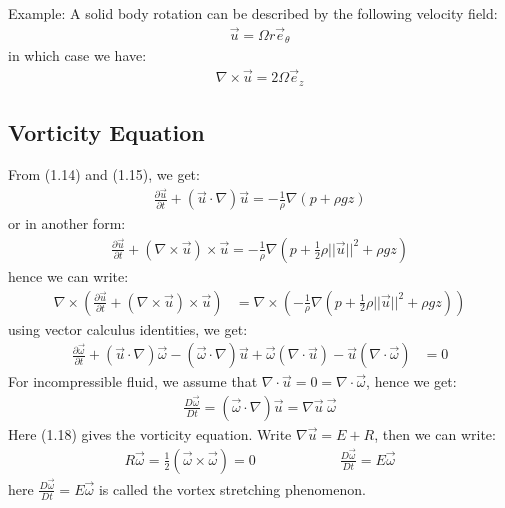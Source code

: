 \documentclass[11pt]{book}
\theoremstyle{break}
\theoremstyle{break}
\newcommand{\example}{\color{green}Example: \color{black}}
\begin{document}
\example 
A solid body rotation can be described by the following velocity field:
\begin{align*}
\vec{u} = \Omega r \vec{e}_{\theta}
\end{align*}
in which case we have:
\begin{align*}
\nabla \times \vec{u} = 2\Omega \vec{e}_{z}
\end{align*}

\hfill\break
\newpage
\subsection*{Vorticity Equation}
From (1.14) and (1.15), we get:
\begin{align*}
\frac{\partial \vec{u}}{\partial t} + (\vec{u}\cdot \nabla) \vec{u}= -\frac{1}{\rho} \nabla(p + \rho g z)
\end{align*}
or in another form:
\begin{align*}
\frac{\partial \vec{u}}{\partial t} + (\nabla \times \vec{u})\times \vec{u} = -\frac{1}{\rho} \nabla \left(p+ \frac{1}{2}\rho ||\vec{u}||^2 + \rho g z\right)
\end{align*}
hence we can write:
\begin{align*}
\nabla \times \left( \frac{\partial \vec{u}}{\partial t} + (\nabla \times \vec{u})\times \vec{u} \right) &= \nabla \times \left( -\frac{1}{\rho} \nabla \left(p+ \frac{1}{2}\rho ||\vec{u}||^2 + \rho g z\right)\right)
\end{align*}
using vector calculus identities, we get:
\begin{align*}
\frac{\partial \vec{\omega}}{\partial t} + (\vec{u}\cdot \nabla ) \vec{\omega} - (\vec{\omega}\cdot \nabla )\vec{u} + \vec{\omega}(\nabla \cdot \vec{u}) - \vec{u}(\nabla \cdot \vec{\omega}) &= 0
\end{align*}
For incompressible fluid, we assume that $\nabla \cdot \vec{u} = 0 = \nabla \cdot \vec{\omega}$,
hence we get:
\begin{align}
\frac{D\vec{\omega}}{Dt} = (\vec{\omega}\cdot \nabla) \vec{u} = \nabla \vec{u} \ \vec{\omega}
\end{align}
Here (1.18) gives the vorticity equation.
Write $\nabla \vec{u} = E+R$, then we can write:
\begin{align*}
R\vec{\omega} = \frac{1}{2}(\vec{\omega}\times \vec{\omega})=0 \qquad\qquad\qquad 
\frac{D\vec{\omega}}{Dt} = E\vec{\omega}
\end{align*}
here $\frac{D\vec{\omega}}{Dt} = E\vec{\omega}$ is called the vortex stretching phenomenon. \\
\end{document}
